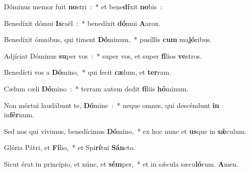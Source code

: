 \item Dóminus memor fuit \textbf{no}\-stri~:~* et bene\textbf{dí}\-xit \textbf{no}\-bis~:
\item Benedíxit dómui \textbf{Is}\-raël~:~* benedíxit \textbf{dó}\-mui \textbf{A}\-aron.
\item Benedíxit ómnibus, qui timent \textbf{Dó}\-minum,~* pu\-síl\-lis \textbf{cum} ma\textbf{jó}\-ribus.
\item Adjíciat Dóminus \textbf{su}\-per vos~:~* super vos, et super \textbf{fí}\-li\-os \textbf{ve}\-stros.
\item Benedícti vos a \textbf{Dó}\-mino,~* qui fecit \textbf{cæ}\-lum, et \textbf{ter}\-ram.
\item Cælum cæli \textbf{Dó}\-mino~:~* terram autem dedit \textbf{fí}\-liis \textbf{hó}\-mi\-num.
\item Non mórtui laudábunt te, \textbf{Dó}\-mine~:~* neque omnes, qui descéndunt \textbf{in} in\textbf{fér}\-num.
\item Sed nos qui vívimus, benedícimus \textbf{Dó}\-mino,~* ex hoc nunc et \textbf{us}\-que in \textbf{sǽ}\-culum.
\item Glória Pátri, et \textbf{Fí}\-lio,~* et Spi\textbf{rí}\-tui \textbf{Sán}\-cto.
\item Sicut érat in princípio, et núnc, et \textbf{sém}\-per,~* et in sǽcula sæcu\textbf{ló}\-rum. \textbf{A}\-men.